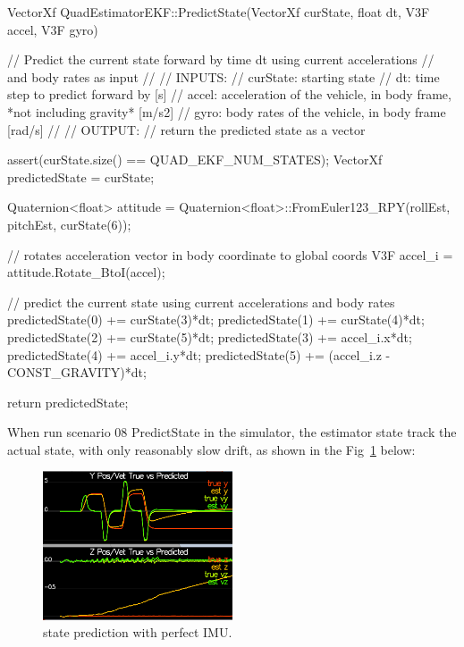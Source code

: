 \documentclass[letterpaper]{article}
\begin{document}
\newpage

\begin{CPP}
VectorXf QuadEstimatorEKF::PredictState(VectorXf curState, float dt, V3F accel, V3F gyro)
{
    // Predict the current state forward by time dt using current accelerations 
    // and body rates as input
    //
    // INPUTS: 
    //   curState: starting state
    //   dt: time step to predict forward by [s]
    //   accel: acceleration of the vehicle, in body frame, *not including gravity* [m/s2]
    //   gyro: body rates of the vehicle, in body frame [rad/s]
    //   
    // OUTPUT:
    //   return the predicted state as a vector

    assert(curState.size() == QUAD_EKF_NUM_STATES);
    VectorXf predictedState = curState;

    Quaternion<float> attitude = Quaternion<float>::FromEuler123_RPY(rollEst, pitchEst, curState(6));

    // rotates acceleration vector in body coordinate to global coords
    V3F accel_i = attitude.Rotate_BtoI(accel);

    // predict the current state using current accelerations and body rates
    predictedState(0) += curState(3)*dt;
    predictedState(1) += curState(4)*dt;
    predictedState(2) += curState(5)*dt;
    predictedState(3) += accel_i.x*dt;
    predictedState(4) += accel_i.y*dt;
    predictedState(5) += (accel_i.z - CONST_GRAVITY)*dt;

    return predictedState;
}
\end{CPP}

When run scenario 08 PredictState in the simulator, the estimator state track the actual state, with only reasonably slow drift, as shown in the Fig~\ref{fig:perfect_imu} below:

\begin{figure}[ht]
\centering
\includegraphics[width=0.5\textwidth]{./images/scenario8_2.png}
\caption{\label{fig:perfect_imu} state prediction with perfect IMU.}
\end{figure}
\end{document}
